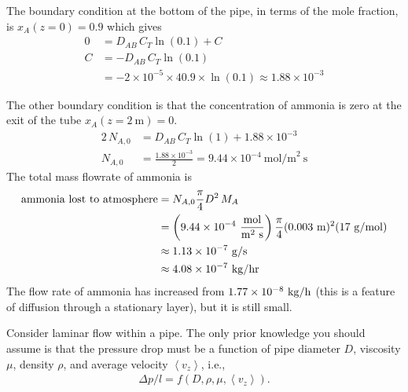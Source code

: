 \documentclass[calculator,datasheet,handbook,solutions]{exam}
\begin{document}
{\begin{question}
\begin{enumerate}[a)]
{        The boundary condition at the bottom of the pipe, in terms of
        the mole fraction, is $x_A(z=0) = 0.9$ which gives
        \begin{align*}
          0 &= D_{AB}\,C_T \ln\left(0.1\right) + C\\
          C &= -D_{AB}\,C_T \ln\left(0.1\right)\\
            &= -2\times10^{-5}\times40.9\times\ln\left(0.1\right) \approx
              1.88\times10^{-3}
        \end{align*}
        
        The other boundary condition is that the concentration of
        ammonia is zero at the exit of the tube $x_A(z=2~\text{m})=0$.
        \begin{align*}
          2\,N_{A,0} &= D_{AB}\,C_T \ln\left(1\right) + 1.88\times10^{-3}\\
          N_{A,0} &= \frac{1.88\times10^{-3}}{2} =9.44\times10^{-4}~\text{mol/m}^2~\text{s}
        \end{align*}
        The total mass flowrate of ammonia is 
        \begin{align*}
          \mbox{ammonia lost to atmosphere} &= N_{A,0} \frac{\pi}{4}D^2\,M_{A} 
          \\
                                            &= \left(9.44\times10^{-4}~\frac{\rm mol}{{\rm m}^2~{\rm s}}\right)
                                              \frac{\pi}{4}(0.003~{\rm m})^2(17~{\rm g/mol})
          \\
                                            &\approx 1.13\times10^{-7}~{\rm g/s}
          \\
                                            &\approx 4.08\times10^{-7}~{\rm kg/hr}
        \end{align*}
        The flow rate of ammonia has increased from
        $1.77\times10^{-8}~{\rm kg/h}$ (this is a feature of diffusion
        through a stationary layer), but it is still small.
      }
    \end{enumerate}
  \end{question}
}{
  \begin{question}
    Consider laminar flow within a pipe. The only prior knowledge
    you should assume is that the pressure drop must be a function of
    pipe diameter $D$, viscosity $\mu$, density $\rho$, and average
    velocity $\left\langle v_z\right\rangle$, i.e.,
    \begin{align*}
      \Delta p/l = f\left(D, \rho, \mu, \left\langle v_z\right\rangle\right).

\end{align*}
\end{question}}
\end{document}
